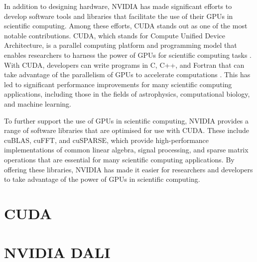 \documentclass[licencjacka,en]{pracamgr}
\begin{document}
In addition to designing hardware, NVIDIA has made significant efforts to develop software tools and libraries that facilitate the use of their GPUs in scientific computing. Among these efforts, CUDA stands out as one of the most notable contributions. CUDA, which stands for Compute Unified Device Architecture, is a parallel computing platform and programming model that enables researchers to harness the power of GPUs for scientific computing tasks \cite{cuda-about}. With CUDA, developers can write programs in C, C++, and Fortran that can take advantage of the parallelism of GPUs to accelerate computations \cite{cuda-toolkit-official}. This has led to significant performance improvements for many scientific computing applications, including those in the fields of astrophysics, computational biology, and machine learning. 

To further support the use of GPUs in scientific computing, NVIDIA provides a range of software libraries that are optimised for use with CUDA. These include cuBLAS, cuFFT, and cuSPARSE, which provide high-performance implementations of common linear algebra, signal processing, and sparse matrix operations that are essential for many scientific computing applications\cite{nvidia-math-libs}. By offering these libraries, NVIDIA has made it easier for researchers and developers to take advantage of the power of GPUs in scientific computing.

\section{CUDA}





\section{NVIDIA DALI}
\end{document}
